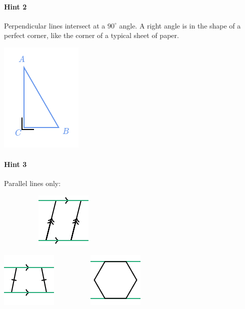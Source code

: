 \documentclass[twocolumn,10pt]{article}
\def\shrinkfactor{0.55}
\begin{document}
\paragraph{Hint 2} Perpendicular lines intersect at a $90 ^\circ$ angle.  
A right angle is in the shape of a perfect corner, like the corner of a typical sheet of paper.


\includegraphics[scale=\shrinkfactor]{figures/497661f48f441186b5e021d8ca8c4f0c7449214f.png}

\paragraph{Hint 3}Parallel lines only:

$\phantom{xxxxxxxx}$
\includegraphics[scale=\shrinkfactor]{figures/dc97e97ad57144cae5a8b5bfdc5d541d8d66aa00.png}

\includegraphics[scale=\shrinkfactor]{figures/68da9c12f9a5652bcfd03be81ae13785412b510b.png}  
$\phantom{xxxxxxxx}$
\includegraphics[scale=\shrinkfactor]{figures/a8914ec8b688d03af4fc47bdfdb83edcce453d65.png}
\end{document}

